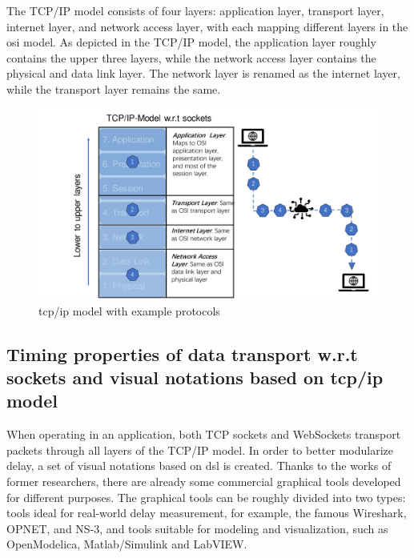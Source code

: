 The TCP/IP model consists of four layers: application layer, transport layer, 
internet layer, and network access layer, with each mapping different layers in 
the \gls{osi} model. As depicted in the TCP/IP model, the application layer roughly 
contains the upper three layers, while the network access layer contains the 
physical and data link layer. The network layer is renamed as the internet 
layer, while the transport layer remains the same.

\begin{figure}[htb]
    \includegraphics[width=\textwidth]{figures/TCP_IP.pdf}
    
    \centering
    \caption{\gls{tcp/ip} model with example protocols \label{fig: TCP_IP}}
\end{figure}

\subsection{Timing properties of data transport w.r.t sockets and visual notations based on \gls{tcp/ip} model}
When operating in an application, both TCP sockets and WebSockets transport packets 
through all layers of the TCP/IP model. In order to better modularize delay, a set of 
visual notations based on \gls{dsl} is created.
Thanks to the works of former researchers, there are already some commercial graphical tools 
developed for different purposes. The graphical tools 
can be roughly divided into two types: tools ideal for real-world delay measurement, 
for example, the famous Wireshark, OPNET, and NS-3, 
and tools suitable for modeling and visualization, such as OpenModelica, 
Matlab/Simulink and LabVIEW.


